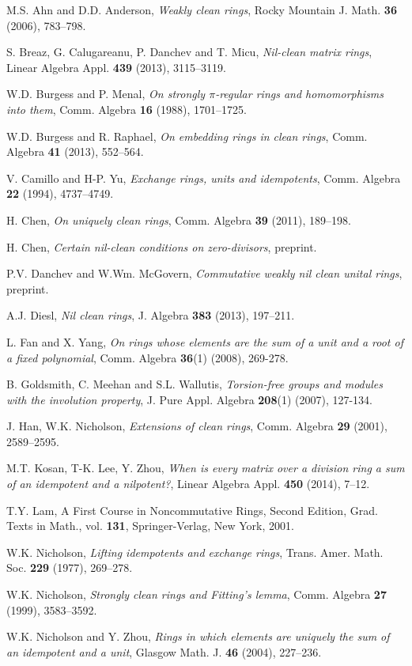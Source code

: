 \documentclass[12]{amsart}
\theoremstyle{definition}
\numberwithin{equation}{section}
\begin{document}
\begin{thebibliography}{99}

 M.S. Ahn and D.D. Anderson, {\it Weakly clean rings}, Rocky Mountain J. Math. {\bf 36} (2006),
783--798.

S. Breaz, G. Calugareanu, P. Danchev and T. Micu, {\it Nil-clean matrix rings}, Linear Algebra Appl. {\bf 439} (2013), 3115--3119.

W.D. Burgess and P. Menal, {\it On strongly $\pi$-regular rings and homomorphisms into them}, Comm. Algebra {\bf 16} (1988), 1701--1725.

W.D. Burgess and R. Raphael, {\it On embedding rings in clean rings}, Comm. Algebra {\bf 41} (2013), 552--564.

V. Camillo and H-P. Yu,  {\it Exchange rings, units and idempotents},  Comm. Algebra {\bf 22} (1994), 4737--4749.

 H. Chen, {\it On uniquely clean rings}, Comm. Algebra {\bf 39} (2011), 189--198.

H. Chen, {\it Certain nil-clean conditions on zero-divisors}, preprint.

P.V. Danchev and W.Wm. McGovern, {\it Commutative weakly nil clean unital rings}, preprint.

A.J. Diesl,  {\it Nil clean rings}, J. Algebra {\bf 383} (2013), 197--211.

 L. Fan and X. Yang,  {\it On rings whose elements are the sum of a unit and a root of a fixed polynomial},  Comm. Algebra {\bf 36}(1) (2008),  269-278.

 B. Goldsmith, C. Meehan and S.L. Wallutis,  {\it Torsion-free groups and modules with the involution property}, J. Pure Appl. Algebra {\bf 208}(1) (2007), 127-134.

J. Han, W.K.  Nicholson, {\it Extensions of clean rings}, Comm. Algebra {\bf 29} (2001), 2589--2595.

M.T. Kosan, T-K. Lee, Y. Zhou, {\it When is every matrix over a division ring a sum of an idempotent and a nilpotent?}, Linear Algebra Appl. {\bf 450} (2014), 7--12.

T.Y. Lam, A First Course in Noncommutative Rings, Second Edition, Grad. Texts in Math., vol. {\bf 131}, Springer-Verlag, New York, 2001.

W.K. Nicholson, {\it Lifting idempotents and exchange rings}, Trans. Amer. Math. Soc. {\bf 229} (1977), 269--278.

W.K. Nicholson, {\it Strongly clean rings and Fitting's lemma}, Comm. Algebra {\bf 27} (1999), 3583--3592.

W.K. Nicholson and Y. Zhou, {\it Rings in which elements are uniquely the sum of an idempotent and a unit}, Glasgow Math. J. {\bf 46} (2004), 227--236.

\end{thebibliography}
\end{document}
